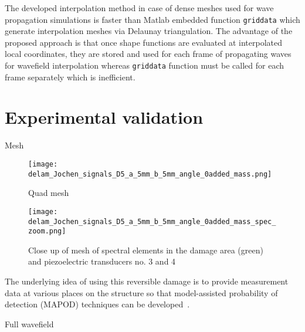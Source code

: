 \documentclass[preprint,12pt]{elsarticle}
\begin{document}
	The developed interpolation method in case of dense meshes used for wave propagation simulations is faster than Matlab embedded function \verb|griddata| which generate interpolation meshes via Delaunay triangulation. The advantage of the proposed approach is that once shape functions are evaluated at interpolated local coordinates, they are stored and used for each frame of propagating waves for wavefield interpolation whereas  \verb|griddata| function must be called for each frame separately which is inefficient.

	\section{Experimental validation}
	
	Mesh
	\begin{figure} [h!]
		\centering
		\texttt{[image: delam\_Jochen\_signals\_D5\_a\_5mm\_b\_5mm\_angle\_0added\_mass.png]}	
		\caption{Quad mesh}
		\label{fig:quad_mesh}
	\end{figure}
   \begin{figure} [h!]
   	\centering
   	\texttt{[image: delam\_Jochen\_signals\_D5\_a\_5mm\_b\_5mm\_angle\_0added\_mass\_spec\_zoom.png]}	
   	\caption{Close up of mesh of spectral elements in the damage area (green) and piezoelectric transducers no. 3 and 4}
   	\label{fig:spec_mesh_zoom}
   \end{figure}
	The underlying idea of using this reversible damage is to provide measurement data at various places on the structure so that model-assisted probability of detection (MAPOD) techniques can be developed~\cite{Eckstein2012}.
	
	Full wavefield
	
\end{document}
